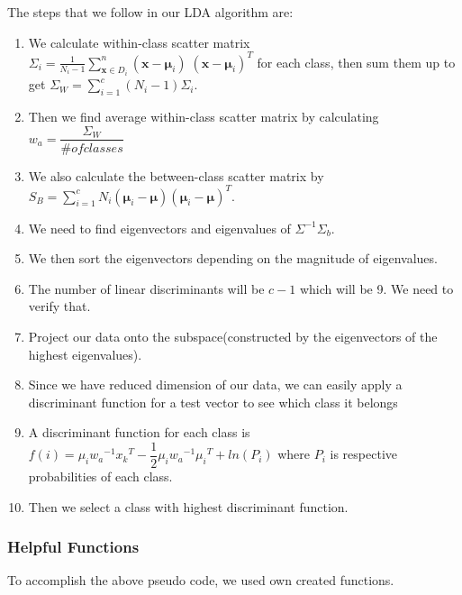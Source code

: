 The steps that we follow in our LDA algorithm are: 
\begin{enumerate}
	\item We calculate within-class scatter matrix $\Sigma_i = \frac{1}{N_{i}-1} \sum\limits_{\pmb x \in D_i}^n (\pmb x - \pmb \mu_i)\;(\pmb x - \pmb \mu_i)^T$ for each class, then sum them up to get $\Sigma_W = \sum\limits_{i =1}^{c} (N_i - 1) \Sigma_i  $.
	\item Then we find average within-class scatter matrix by calculating $w_a =\dfrac{\Sigma_W}{\# of classes}$
	\item We also calculate the between-class scatter matrix by $S_B = \sum\limits_{i =1}^c N_i (\pmb \mu_i - \pmb \mu) (\pmb \mu_i - \pmb \mu)^T$.
	\item We need to find eigenvectors and eigenvalues of $\Sigma^{-1} \Sigma_b$.
	\item We then sort the eigenvectors depending on the magnitude of eigenvalues.
	\item The number of linear discriminants will be $c-1$ which will be 9. We need to verify that.
	\item Project our data onto the subspace(constructed by the eigenvectors of the highest eigenvalues).
	\item Since we have reduced dimension of our data, we can easily apply a discriminant function for a test vector to see which class it belongs
	\item A discriminant function for each class is $f(i) = \mu_i {w_a}^{-1} {x_k}^T - \dfrac{1}{2} \mu_i {w_a}^{-1} {\mu_i}^T + ln(P_i)$ where $P_i$ is respective probabilities of each class.
	\item Then we select a class with highest discriminant function.
\end{enumerate}
\subsubsection{Helpful Functions}
To accomplish the above pseudo code, we used own created functions.  

